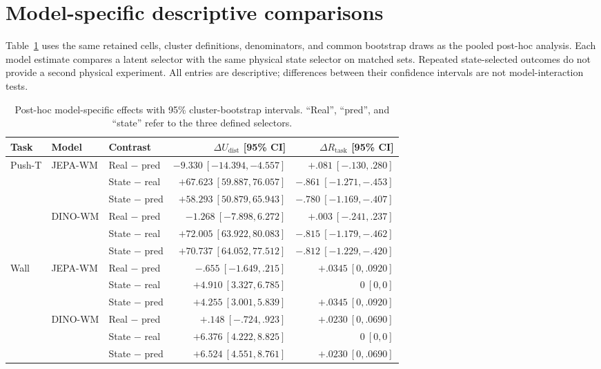 \documentclass{article}
\begin{document}
\section{Model-specific descriptive comparisons}
\label{app:models}

Table~\ref{tab:models} uses the same retained cells, cluster definitions,
denominators, and common bootstrap draws as the pooled post-hoc analysis.
Each model estimate compares a latent selector with the same physical state
selector on matched sets. Repeated state-selected outcomes do not provide a
second physical experiment. All entries are descriptive; differences between
their confidence intervals are not model-interaction tests.

\begin{table}[h]
\caption{Post-hoc model-specific effects with 95\% cluster-bootstrap
intervals. ``Real'', ``pred'', and ``state'' refer to the three defined selectors.}
\label{tab:models}
\centering\small
\begin{tabular}{lllrr}
\toprule
Task & Model & Contrast & $\Delta U_{\mathrm{dist}}$ [95\% CI] & $\Delta R_{\mathrm{task}}$ [95\% CI]\\
\midrule
Push-T & JEPA-WM & Real $-$ pred & $-9.330\ [-14.394,-4.557]$ & $+.081\ [-.130,.280]$\\
 & & State $-$ real & $+67.623\ [59.887,76.057]$ & $-.861\ [-1.271,-.453]$\\
 & & State $-$ pred & $+58.293\ [50.879,65.943]$ & $-.780\ [-1.169,-.407]$\\
 & DINO-WM & Real $-$ pred & $-1.268\ [-7.898,6.272]$ & $+.003\ [-.241,.237]$\\
 & & State $-$ real & $+72.005\ [63.922,80.083]$ & $-.815\ [-1.179,-.462]$\\
 & & State $-$ pred & $+70.737\ [64.052,77.512]$ & $-.812\ [-1.229,-.420]$\\
\addlinespace
Wall & JEPA-WM & Real $-$ pred & $-.655\ [-1.649,.215]$ & $+.0345\ [0,.0920]$\\
 & & State $-$ real & $+4.910\ [3.327,6.785]$ & $0\ [0,0]$\\
 & & State $-$ pred & $+4.255\ [3.001,5.839]$ & $+.0345\ [0,.0920]$\\
 & DINO-WM & Real $-$ pred & $+.148\ [-.724,.923]$ & $+.0230\ [0,.0690]$\\
 & & State $-$ real & $+6.376\ [4.222,8.825]$ & $0\ [0,0]$\\
 & & State $-$ pred & $+6.524\ [4.551,8.761]$ & $+.0230\ [0,.0690]$\\
\bottomrule
\end{tabular}
\end{table}
\end{document}
